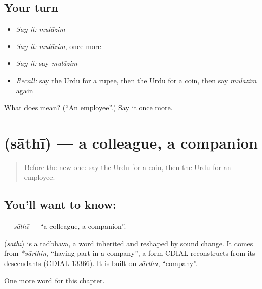 \subsection*{Your turn}
\begin{itemize}
\raggedright
  \item \emph{Say it:} \emph{mulāzim}
  \item \emph{Say it:} \emph{mulāzim}, once more
  \item \emph{Say it:} say \emph{mulāzim}
  \item \emph{Recall:} say the Urdu for a rupee, then the Urdu for a coin, then say \emph{mulāzim} again
\end{itemize}

\begin{tcolorbox}[breakable,colback=teal!4,colframe=teal!35!black,title={Before you move on}]
What does  mean? (\textquotedblleft{}An employee\textquotedblright{}.) Say it once more.
\end{tcolorbox}
\section[\texorpdfstring{\ur{ساتھی} (sāthī)}{ساتھی (sāthī)}]{ (sāthī) — a colleague, a companion}

\label{lesson:UR-C177-sathi}



\begin{quote}
Before the new one: say the Urdu for a coin, then the Urdu for an employee.
\end{quote}

\subsection*{You'll want to know: }
\textbf{} — \emph{sāthī} — \textquotedblleft{}a colleague, a companion\textquotedblright{}.

\begin{cousinweb}
\textbf{} (\emph{sāthī}) is a tadbhava, a word inherited and reshaped by sound change. It comes from \emph{*sārthin}, \textquotedblleft{}having part in a company\textquotedblright{}, a form CDIAL reconstructs from its descendants (CDIAL 13366). It is built on \emph{sārtha}, \textquotedblleft{}company\textquotedblright{}.
\end{cousinweb}

\begin{grammarlens}[title={What you've built}]
One more word for this chapter.
\end{grammarlens}

